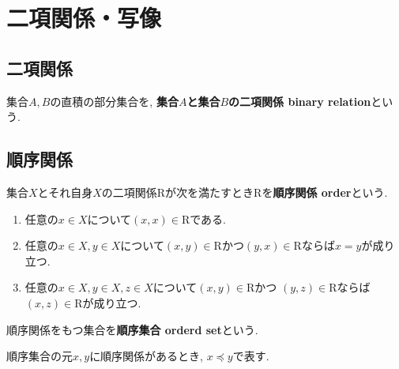 \section{二項関係・写像}
\subsection{二項関係}
\begin{Def}
集合$A,B$の直積の部分集合を, {\bf 集合$A$と集合$B$の二項関係 binary relation}という.
\end{Def}

\subsection{順序関係}
\begin{Def}
集合$X$とそれ自身$X$の二項関係$\mathrm{R}$が次を満たすとき$\mathrm{R}$を{\bf 順序関係 order}という.
\begin{enumerate}
\item 任意の$x\in X$について$(x,x)\in \mathrm{R}$である.
\item 任意の$x\in X,y\in X$について$(x,y)\in \mathrm{R}$かつ$(y,x)\in \mathrm{R}$ならば$x=y$が成り立つ.
\item 任意の$x\in X,y\in X,z\in X$について$(x,y)\in \mathrm{R}$かつ $(y,z)\in \mathrm{R}$ならば
$(x,z)\in \mathrm{R}$が成り立つ.
\end{enumerate}
\end{Def}
\begin{Def}
順序関係をもつ集合を{\bf 順序集合 orderd set}という.
\end{Def}
\begin{Notation}
順序集合の元$x,y$に順序関係があるとき, $x\preceq y$で表す.
\end{Notation}
